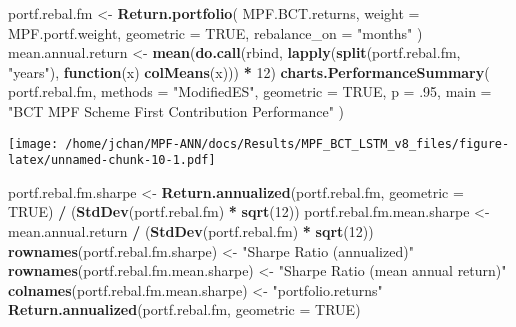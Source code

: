 \documentclass[]{article}
\newenvironment{Shaded}{\begin{snugshade}}{\end{snugshade}}
\newcommand{\ControlFlowTok}[1]{\textcolor[rgb]{0.13,0.29,0.53}{\textbf{#1}}}
\newcommand{\DataTypeTok}[1]{\textcolor[rgb]{0.13,0.29,0.53}{#1}}
\newcommand{\DecValTok}[1]{\textcolor[rgb]{0.00,0.00,0.81}{#1}}
\newcommand{\FloatTok}[1]{\textcolor[rgb]{0.00,0.00,0.81}{#1}}
\newcommand{\KeywordTok}[1]{\textcolor[rgb]{0.13,0.29,0.53}{\textbf{#1}}}
\newcommand{\NormalTok}[1]{#1}
\newcommand{\OperatorTok}[1]{\textcolor[rgb]{0.81,0.36,0.00}{\textbf{#1}}}
\newcommand{\OtherTok}[1]{\textcolor[rgb]{0.56,0.35,0.01}{#1}}
\newcommand{\StringTok}[1]{\textcolor[rgb]{0.31,0.60,0.02}{#1}}
\begin{document}
\begin{Shaded}
\begin{Highlighting}[]
\NormalTok{portf.rebal.fm <-}\StringTok{ }\KeywordTok{Return.portfolio}\NormalTok{(}
\NormalTok{  MPF.BCT.returns,}
  \DataTypeTok{weight =}\NormalTok{ MPF.portf.weight,}
  \DataTypeTok{geometric =} \OtherTok{TRUE}\NormalTok{,}
  \DataTypeTok{rebalance_on =} \StringTok{"months"}
\NormalTok{)}
\NormalTok{mean.annual.return <-}
\StringTok{  }\KeywordTok{mean}\NormalTok{(}\KeywordTok{do.call}\NormalTok{(rbind, }\KeywordTok{lapply}\NormalTok{(}\KeywordTok{split}\NormalTok{(portf.rebal.fm, }\StringTok{"years"}\NormalTok{), }\ControlFlowTok{function}\NormalTok{(x)}
    \KeywordTok{colMeans}\NormalTok{(x))) }\OperatorTok{*}\StringTok{ }\DecValTok{12}\NormalTok{)}
\KeywordTok{charts.PerformanceSummary}\NormalTok{(}
\NormalTok{  portf.rebal.fm,}
  \DataTypeTok{methods =} \StringTok{"ModifiedES"}\NormalTok{,}
  \DataTypeTok{geometric =} \OtherTok{TRUE}\NormalTok{,}
  \DataTypeTok{p =} \FloatTok{.95}\NormalTok{,}
  \DataTypeTok{main =} \StringTok{"BCT MPF Scheme First Contribution Performance"}
\NormalTok{)}
\end{Highlighting}
\end{Shaded}

\texttt{[image: /home/jchan/MPF-ANN/docs/Results/MPF\_BCT\_LSTM\_v8\_files/figure-latex/unnamed-chunk-10-1.pdf]}

\begin{Shaded}
\begin{Highlighting}[]
\NormalTok{portf.rebal.fm.sharpe <-}
\StringTok{  }\KeywordTok{Return.annualized}\NormalTok{(portf.rebal.fm, }\DataTypeTok{geometric =} \OtherTok{TRUE}\NormalTok{) }\OperatorTok{/}\StringTok{ }\NormalTok{(}\KeywordTok{StdDev}\NormalTok{(portf.rebal.fm) }\OperatorTok{*}\StringTok{ }\KeywordTok{sqrt}\NormalTok{(}\DecValTok{12}\NormalTok{))}
\NormalTok{portf.rebal.fm.mean.sharpe <-}
\StringTok{  }\NormalTok{mean.annual.return }\OperatorTok{/}\StringTok{ }\NormalTok{(}\KeywordTok{StdDev}\NormalTok{(portf.rebal.fm) }\OperatorTok{*}\StringTok{ }\KeywordTok{sqrt}\NormalTok{(}\DecValTok{12}\NormalTok{))}
\KeywordTok{rownames}\NormalTok{(portf.rebal.fm.sharpe) <-}\StringTok{ "Sharpe Ratio (annualized)"}
\KeywordTok{rownames}\NormalTok{(portf.rebal.fm.mean.sharpe) <-}
\StringTok{  "Sharpe Ratio (mean annual return)"}
\KeywordTok{colnames}\NormalTok{(portf.rebal.fm.mean.sharpe) <-}\StringTok{ "portfolio.returns"}
\KeywordTok{Return.annualized}\NormalTok{(portf.rebal.fm, }\DataTypeTok{geometric =} \OtherTok{TRUE}\NormalTok{)}
\end{Highlighting}
\end{Shaded}
\end{document}
